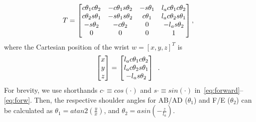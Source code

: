 \documentclass[letterpaper, 10pt, conference]{ieeeconf}      %
\begin{document}
\begin{gather}
  \scalebox{1}{%
  $T =$
        $  \begin{bmatrix}
   c\theta_1c\theta_2 &   -c\theta_1 s \theta_2    & -s\theta_1 & l_ac\theta_1c\theta_2 \\
   c\theta_2s\theta_1 &  -s\theta_1 s \theta_2 &   c\theta_1   & l_ac\theta_2s\theta_1 \\
   -s\theta_2  & - c\theta_2  & 0  & -l_a s\theta_2  \\
      0 & 0 & 0 &  1\\
  \end{bmatrix},
$
    \label{eq:forward}}
  \end{gather}
%
where the Cartesian position of the wrist $w=[x,y,z]^T$ is
%
 \begin{gather}
  \scalebox{1}{%
  $\begin{bmatrix}
   x \\
    y\\
    z\\
  \end{bmatrix}=$
   $\begin{bmatrix}
   l_ac\theta_1c\theta_2 \\
    l_ac\theta_2s\theta_1\\
   - l_a s\theta_2\\
  \end{bmatrix}\enspace.
  $
   \label{eq:forw}}
 \end{gather}
%
For brevity, we use shorthands $c\cdot \equiv cos(\cdot)$ and $s\cdot \equiv sin(\cdot)$ in~\eqref{eq:forward}--\eqref{eq:forw}. 
Then, the respective shoulder angles for AB/AD ($\theta_1$) and F/E ($\theta_2$) can be calculated as 
%
$\theta_1 = atan2\left(\frac{y}{x}\right)$, and %
$\theta_2 = asin\left( -\frac{z}{l_a} \right)$. %




\end{document}
